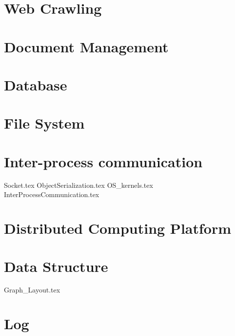 \documentclass[11pt]{book}
\begin{document}
\part{Web Crawling}



\part{Document Management}



\part{Database}
 



 


  



\part{File System}



\part{Inter-process communication}
{Socket.tex}
{ObjectSerialization.tex}
{OS_kernels.tex}
{InterProcessCommunication.tex}

\part{Distributed Computing Platform}

\part{Data Structure}
 
{Graph_Layout.tex}


\part{Log}


 
\end{document}
